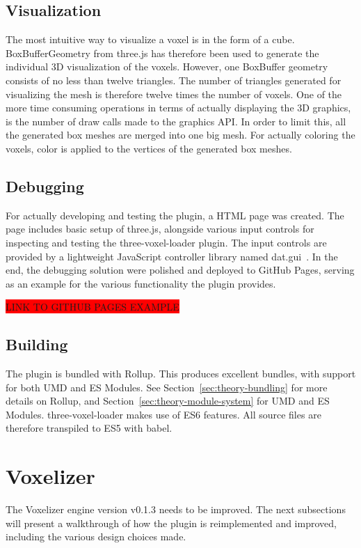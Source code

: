 \subsection{Visualization}
The most intuitive way to visualize a voxel is in the form of a cube. BoxBufferGeometry from three.js has therefore been used to generate the individual 3D visualization of the voxels. However, one BoxBuffer geometry consists of no less than twelve triangles. The number of triangles generated for visualizing the mesh is therefore twelve times the number of voxels. One of the more time consuming operations in terms of actually displaying the 3D graphics, is the number of draw calls made to the graphics API. In order to limit this, all the generated box meshes are merged into one big mesh. For actually coloring the voxels, color is applied to the vertices of the generated box meshes.

\subsection{Debugging}
For actually developing and testing the plugin, a HTML page was created. The page includes basic setup of three.js, alongside various input controls for inspecting and testing the three-voxel-loader plugin. The input controls are provided by a lightweight JavaScript controller library named dat.gui~\cite{dat.gui}. In the end, the debugging solution were polished and deployed to GitHub Pages, serving as an example for the various functionality the plugin provides.

\colorbox{red}{LINK TO GITHUB PAGES EXAMPLE}

\subsection{Building}
The plugin is bundled with Rollup. This produces excellent bundles, with support for both UMD and ES Modules. See Section~\ref{sec:theory-bundling} for more details on Rollup, and Section~\ref{sec:theory-module-system} for UMD and ES Modules. three-voxel-loader makes use of ES6 features. All source files are therefore transpiled to ES5 with babel.

\section{Voxelizer}
The Voxelizer engine version v0.1.3 needs to be improved. The next subsections will present a walkthrough of how the plugin is reimplemented and improved, including the various design choices made.

